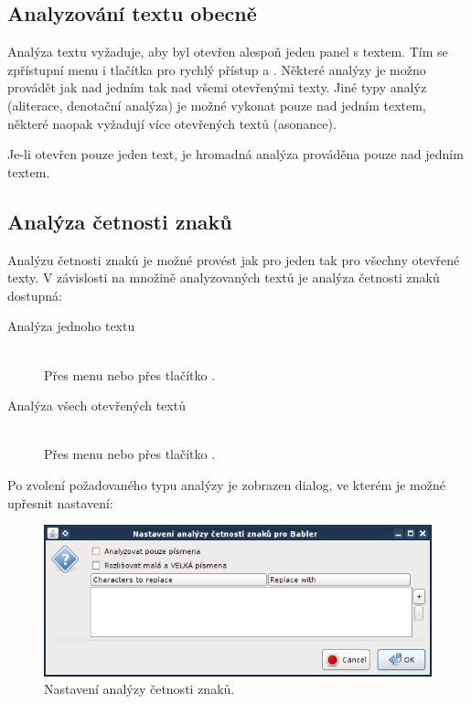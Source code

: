 \documentclass[dp.tex]{subfiles}
\begin{document}
\subsection{Analyzování textu obecně}

Analýza textu vyžaduje, aby byl otevřen alespoň jeden panel s textem. Tím se zpřístupní menu  i tlačítka pro rychlý přístup  a .  Některé analýzy je možno provádět jak nad jedním tak nad všemi otevřenými texty. Jiné typy analýz (aliterace, denotační analýza) je možné vykonat pouze nad jedním textem, některé naopak vyžadují více otevřených textů (asonance).

Je-li otevřen pouze jeden text, je hromadná analýza prováděna pouze nad jedním textem.

\subsection{Analýza četnosti znaků}
\label{chap:analyza-cetnosti-znaku}

Analýzu četnosti znaků je možné provést jak pro jeden tak pro všechny otevřené texty. V závislosti na množině analyzovaných textů je analýza četnosti znaků dostupná:
\begin{description}
  \item[Analýza jednoho textu] \hfill \\
	Přes menu  nebo přes tlačítko .
  \item[Analýza všech otevřených textů] \hfill \\
	Přes menu  nebo přes tlačítko .
\end{description}

Po zvolení požadovaného typu analýzy je zobrazen dialog, ve kterém je možné upřesnit nastavení:

\begin{figure}[H]
\centering
\includegraphics[max width=\textwidth,keepaspectratio=true]{imgs-60-aplikace/gui-character-analysis-dialog}
\caption{Nastavení analýzy četnosti znaků.}
\label{fig:gui-character-analysis-dialog}
\end{figure}
\end{document}
